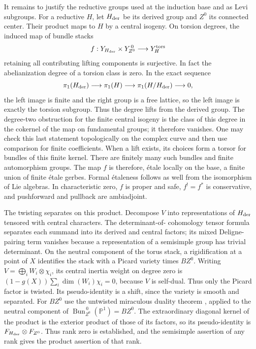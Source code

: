 \documentclass[11pt]{article}
\numberwithin{equation}{section}
\theoremstyle{definition}
\theoremstyle{remark}
\begin{document}
It remains to justify the reductive groups used at the induction base and
as Levi subgroups.  For a reductive $H$, let $H_{\rm der}$ be its derived
group and $Z^0$ its connected center.  Their product maps to $H$ by a
central isogeny.  On torsion degrees, the induced map of bundle stacks
\[
 f:Y_{H_{\rm der}}\times Y_{Z^0}^{\,0}\longrightarrow Y_H^{\rm tors}
\]
retaining all contributing lifting components is surjective.  In fact the
abelianization degree of a torsion class is zero.  In the exact sequence
\[
 \pi_1(H_{\rm der})\longrightarrow\pi_1(H)
 \longrightarrow\pi_1(H/H_{\rm der})\longrightarrow0,
\]
the left image is finite and the right group is a free lattice, so the
left image is exactly the torsion subgroup.  Thus the degree lifts from
the derived group.  The degree-two obstruction for the finite central
isogeny is the class of this degree in the cokernel of the map on
fundamental groups; it therefore vanishes.  One may check this last statement topologically on the complex
curve and then use comparison for finite coefficients.  When a lift
exists, its choices form a torsor for bundles of this finite kernel.
There are finitely many such bundles and finite automorphism groups.
The map $f$ is therefore, \'{e}tale locally on the base, a finite union of
finite \'{e}tale gerbes.  Formal \'{e}taleness follows as well from the
isomorphism of Lie algebras.  In characteristic zero, $f$ is proper and
safe, $f^!=f^*$ is conservative, and pushforward and pullback are
ambiadjoint.

The twisting separates on this product.  Decompose $V$ into representations
of $H_{\rm der}$ tensored with central characters.  The determinant-of-
cohomology tensor formula separates each summand into its derived and
central factors; its mixed Deligne-pairing term vanishes because a
representation of a semisimple group has trivial determinant.  On the
neutral component of the torus stack, a rigidification at a point of $X$
identifies the stack with a Picard variety times $BZ^0$.  Writing $V=\bigoplus_i W_i\otimes\chi_i$, its central inertia weight
on degree zero is $(1-g(X))\sum_i\dim(W_i)\chi_i=0$, because $V$ is
self-dual.  Thus only the Picard factor is twisted.  Its
pseudo-identity is a shift, since the variety is smooth and separated.
For $BZ^0$ use the untwisted miraculous duality theorem
\cite[Theorem~0.1.6]{GaitsgoryStrange}, applied to the neutral component of
$\operatorname{Bun}_{Z^0}^{\,0}(\mathbb P^1)=BZ^0$.  The extraordinary diagonal kernel of the product is the exterior
product of those of its factors, so its pseudo-identity is
$F_{H_{\rm der}}\otimes F_{Z^0}$.  Thus rank zero is established, and
the semisimple assertion of any rank gives the product assertion of that
rank.
\end{document}
